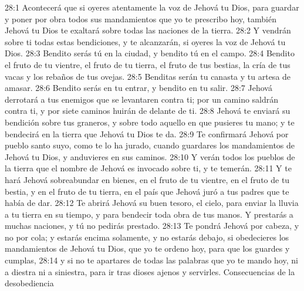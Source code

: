 28:1 Acontecerá que si oyeres atentamente la voz de Jehová tu Dios, para guardar y poner por obra todos sus mandamientos que yo te prescribo hoy, también Jehová tu Dios te exaltará sobre todas las naciones de la tierra.  
28:2 Y vendrán sobre ti todas estas bendiciones, y te alcanzarán, si oyeres la voz de Jehová tu Dios.  
28:3 Bendito serás tú en la ciudad, y bendito tú en el campo.  
28:4 Bendito el fruto de tu vientre, el fruto de tu tierra, el fruto de tus bestias, la cría de tus vacas y los rebaños de tus ovejas.  
28:5 Benditas serán tu canasta y tu artesa de amasar.  
28:6 Bendito serás en tu entrar, y bendito en tu salir.  
28:7 Jehová derrotará a tus enemigos que se levantaren contra ti; por un camino saldrán contra ti, y por siete caminos huirán de delante de ti.  
28:8 Jehová te enviará su bendición sobre tus graneros, y sobre todo aquello en que pusieres tu mano; y te bendecirá en la tierra que Jehová tu Dios te da.  
28:9 Te confirmará Jehová por pueblo santo suyo, como te lo ha jurado, cuando guardares los mandamientos de Jehová tu Dios, y anduvieres en sus caminos.  
28:10 Y verán todos los pueblos de la tierra que el nombre de Jehová es invocado sobre ti, y te temerán.  
28:11 Y te hará Jehová sobreabundar en bienes, en el fruto de tu vientre, en el fruto de tu bestia, y en el fruto de tu tierra, en el país que Jehová juró a tus padres que te había de dar.  
28:12 Te abrirá Jehová su buen tesoro, el cielo, para enviar la lluvia a tu tierra en su tiempo, y para bendecir toda obra de tus manos. Y prestarás a muchas naciones, y tú no pedirás prestado.  
28:13 Te pondrá Jehová por cabeza, y no por cola; y estarás encima solamente, y no estarás debajo, si obedecieres los mandamientos de Jehová tu Dios, que yo te ordeno hoy, para que los guardes y cumplas,  
28:14 y si no te apartares de todas las palabras que yo te mando hoy, ni a diestra ni a siniestra, para ir tras dioses ajenos y servirles. 
Consecuencias de la desobediencia  
 
